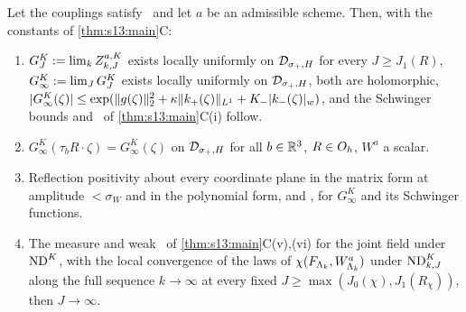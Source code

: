 \begin{proposition}\label{prop:s13:WK}
Let the couplings satisfy \Tthree\ and let $a$ be an admissible scheme. Then, with the constants of \cref{thm:s13:main}C:
\begin{enumerate}[label=\textup{(\alph*)},leftmargin=*,nosep]
\item $G^K_J:=\lim_kZ^{a,K}_{k,J}$ exists locally uniformly on $\mathcal D_{\sigma_+,H}$ for every $J\ge J_1(R)$, $G^K_\infty:=\lim_JG^K_J$ exists locally uniformly on $\mathcal D_{\sigma_+,H}$, both are holomorphic, $|G^K_\infty(\zeta)|\le\exp(\lVert g(\zeta)\rVert_2^2+\kappa\lVert k_+(\zeta)\rVert_{L^1}+K_-\lvert k_-(\zeta)\rvert_{w})$, and the Schwinger bounds and \Ezz\ of \cref{thm:s13:main}C(i) follow.
\item $G^K_\infty(\tau_bR\cdot\zeta)=G^K_\infty(\zeta)$ on $\mathcal D_{\sigma_+,H}$ for all $b\in\mathbb R^3$, $R\in O_h$, $W^a$ a scalar.
\item Reflection positivity about every coordinate plane in the matrix form at amplitude $<\sigma_W$ and in the polynomial form, and \OSth, for $G^K_\infty$ and its Schwinger functions.
\item The measure and weak \OSf\ of \cref{thm:s13:main}C(v),(vi) for the joint field under $\mathrm{ND}^{K}$, with the local convergence of the laws of $\chi(F_{\Lambda_k},W^a_{\Lambda_k})$ under $\mathrm{ND}^{K}_{k,J}$ along the full sequence $k\to\infty$ at every fixed $J\ge\max(J_0(\chi),J_1(R_\chi))$, then $J\to\infty$.
\end{enumerate}
\end{proposition}

